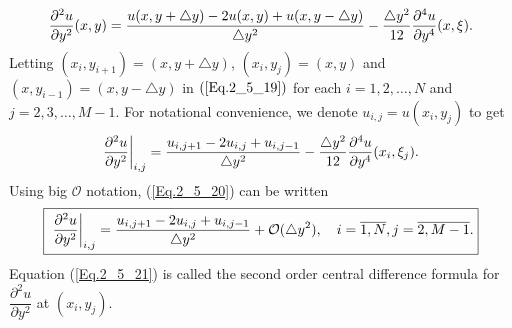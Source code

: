 \begin{align}{\label{Eq.2_5_19}}
\dfrac{\partial^2 u}{\partial y^{2}} (x, y)= \dfrac{u(x, y + \triangle y) - 2 u(x, y) + u(x, y - \triangle y)}{ \triangle  y^{2} } -  \dfrac{\triangle y^{2}}{12} \dfrac{\partial^4 u}{\partial y^{4}} (x,\xi).
\end{align}
Letting $(x_{i},y_{i+1}) = (x,y+ \triangle y)$, $(x_{i},y_{j}) = (x,y)$ and $(x, y_{i-1}) = (x,y- \triangle y)$ in $(\ref{Eq.2_5_19})$ for each $i=1,2,\dots,N$ and $j = 2,3,\dots,M-1$. For notational convenience, we denote $u_{i,j}= u(x_{i},y_{j})$ to get
\begin{align}{\label{Eq.2_5_20}}
\dfrac{\partial^2 u}{\partial y^{2}}\bigg|_{i,j}= \dfrac{u_{i,j+1} - 2 u_{i,j}+ u_{i,j-1} }{ \triangle  y^{2} } -  \dfrac{\triangle y^{2}}{12} \dfrac{\partial^4 u}{\partial y^{4}} (x_{i},\xi_{j}).
\end{align}
Using big $\mathcal{O}$ notation, (\ref{Eq.2_5_20}) can be written
\begin{align}{\label{Eq.2_5_21}}
\fbox{ $ \displaystyle \dfrac{\partial^2 u}{\partial y^{2}}\bigg|_{i,j}= \dfrac{u_{i,j+1} - 2 u_{i,j}+ u_{i,j-1} }{ \triangle  y^{2} } + \mathcal{O}(\triangle y^{2}),\quad i =\overline{1,N}, j=\overline{2,M-1}.$}
\end{align}
Equation (\ref{Eq.2_5_21}) is called the second order central difference formula for $\dfrac{\partial^{2} u}{\partial y^{2} } $ at $(x_{i}, y_{j})$.